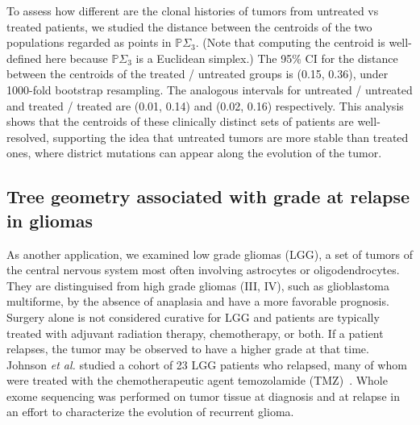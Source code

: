 \documentclass[a4paper,11pt]{article}
\begin{document}
To assess how different are the clonal histories of tumors from untreated vs treated patients, we studied the distance between the centroids of the two populations regarded as points in $\mathbb{P}\Sigma_3$.  (Note that computing the centroid is well-defined here because $\mathbb{P}\Sigma_3$ is a Euclidean simplex.)
The 95\% CI for the distance between the centroids of the treated / untreated groups is (0.15, 0.36), under 1000-fold bootstrap resampling.
The analogous intervals for untreated / untreated and treated / treated are (0.01, 0.14) and (0.02, 0.16) respectively.
This analysis shows that the centroids of these clinically distinct sets of patients are well-resolved, supporting the idea that untreated tumors are more stable than treated ones, where district mutations can appear along the evolution of the tumor.

\subsection{Tree geometry associated with grade at relapse in gliomas}\label{sec:glioma}

As another application, we examined low grade gliomas (LGG), a set of tumors of the central nervous system most often involving astrocytes or oligodendrocytes.
They are distinguised from high grade gliomas (III, IV), such as glioblastoma multiforme, by the absence of anaplasia and have a more favorable prognosis.
Surgery alone is not considered curative for LGG and patients are typically treated with adjuvant radiation therapy, chemotherapy, or both.
If a patient relapses, the tumor may be observed to have a higher grade at that time.
Johnson \textit{et al.} studied a cohort of 23 LGG patients who relapsed, many of whom were treated with the chemotherapeutic agent temozolamide (TMZ)~\cite{johnson2014mutational}.
Whole exome sequencing was performed on tumor tissue at diagnosis and at relapse in an effort to characterize the evolution of recurrent glioma.
\end{document}
